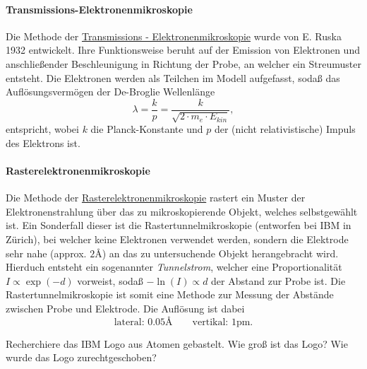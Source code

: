 \documentclass{subfiles}
\begin{document}
        \paragraph*{Transmissions-Elektronenmikroskopie}
            Die Methode der \href{https://de.wikipedia.org/wiki/Transmissionselektronenmikroskop}{Transmissions - Elektronenmikroskopie} wurde von E. Ruska 1932 entwickelt. Ihre Funktionsweise beruht auf der Emission von Elektronen und anschließender Beschleunigung in Richtung der Probe, an welcher ein Streumuster entsteht. Die Elektronen werden als Teilchen im Modell aufgefasst, sodaß das Auflösungsvermögen der De-Broglie Wellenlänge 
            \[\lambda = \frac{k}{p} = \frac{k}{\sqrt{2\cdot m_e\cdot E_\textit{kin}}},\]
            entspricht, wobei $k$ die Planck-Konstante und $p$ der (nicht relativistische) Impuls des Elektrons ist.

        \paragraph*{Rasterelektronenmikroskopie}
            Die Methode der \href{https://de.wikipedia.org/wiki/Rasterelektronenmikroskopie}{Rasterelektronenmikroskopie} rastert ein Muster der Elektronenstrahlung über das zu mikroskopierende Objekt, welches selbstgewählt ist. Ein Sonderfall dieser ist die Rastertunnelmikroskopie (entworfen bei IBM in Zürich), bei welcher keine Elektronen verwendet werden, sondern die Elektrode sehr nahe (approx. $2\si\angstrom$) an das zu untersuchende Objekt herangebracht wird. Hierduch entsteht ein sogenannter \emph{Tunnelstrom}, welcher eine Proportionalität $I\propto \exp(-d)$ vorweist, sodaß $-\ln(I)\propto d$ der Abstand zur Probe ist. Die Rastertunnelmikroskopie ist somit eine Methode zur Messung der Abstände zwischen Probe und Elektrode. Die Auflösung ist dabei 
            \[\text{lateral: }0.05\si\angstrom \qquad\text{vertikal: }1\si{\pico\metre}.\]
            \begin{Aufgabe}
                \nr{} Recherchiere das IBM Logo aus Atomen gebastelt. Wie groß ist das Logo? Wie wurde das Logo zurechtgeschoben?
            \end{Aufgabe}
        
    
\end{document}
